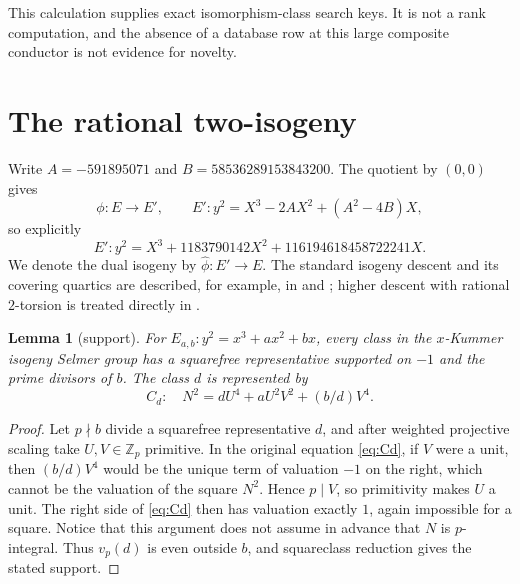 \documentclass[11pt]{article}
\newtheorem{lemma}[theorem]{Lemma}
\begin{document}
This calculation supplies exact isomorphism-class search keys.  It is not a
rank computation, and the absence of a database row at this large composite
conductor is not evidence for novelty.

\section{The rational two-isogeny}
Write $A=-591895071$ and $B=58536289153843200$.  The quotient by
$(0,0)$ gives
\[
 \phi:E\longrightarrow E',\qquad
 E':y^2=X^3-2AX^2+(A^2-4B)X,
\]
so explicitly
\begin{equation}\label{eq:Eprime}
 E':y^2=X^3+1183790142X^2+116194618458722241X.
\end{equation}
We denote the dual isogeny by $\widehat\phi:E'\to E$.  The standard
isogeny descent and its covering quartics are described, for example, in
\cite[Chapter~X, Section~4]{Silverman2009} and
\cite[Chapter~14]{Cassels1991}; higher descent with rational $2$-torsion is
treated directly in \cite{Fisher2017}.

\begin{lemma}[support]\label{lem:support}
For $E_{a,b}:y^2=x^3+ax^2+bx$, every class in the $x$-Kummer isogeny
Selmer group has a squarefree representative supported on $-1$ and the
prime divisors of $b$.  The class $d$ is represented by
\begin{equation}\label{eq:Cd}
 C_d:\quad N^2=dU^4+aU^2V^2+(b/d)V^4.
\end{equation}
\end{lemma}
	\begin{proof}
Let $p\nmid b$ divide a squarefree representative $d$, and after weighted
projective scaling take $U,V\in\mathbb Z_p$ primitive.  In the original
equation \eqref{eq:Cd}, if $V$ were a unit, then $(b/d)V^4$ would be the
unique term of valuation $-1$ on the right, which cannot be the valuation
of the square $N^2$.  Hence $p\mid V$, so primitivity makes $U$ a unit.
The right side of \eqref{eq:Cd} then has valuation exactly $1$, again
impossible for a square.  Notice that this argument does not assume in
advance that $N$ is $p$-integral.  Thus $v_p(d)$ is even outside $b$, and
squareclass reduction gives the stated support.
	\end{proof}
\end{document}
